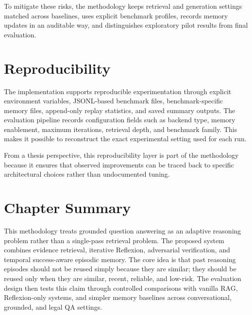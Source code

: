 To mitigate these risks, the methodology keeps retrieval and generation settings matched across baselines, uses explicit benchmark profiles, records memory updates in an auditable way, and distinguishes exploratory pilot results from final evaluation.

\section{Reproducibility}
\label{sec:methodology-reproducibility}

The implementation supports reproducible experimentation through explicit environment variables, JSONL-based benchmark files, benchmark-specific memory files, append-only replay statistics, and saved summary outputs. The evaluation pipeline records configuration fields such as backend type, memory enablement, maximum iterations, retrieval depth, and benchmark family. This makes it possible to reconstruct the exact experimental setting used for each run.

From a thesis perspective, this reproducibility layer is part of the methodology because it ensures that observed improvements can be traced back to specific architectural choices rather than undocumented tuning.

\section{Chapter Summary}
\label{sec:methodology-summary}

This methodology treats grounded question answering as an adaptive reasoning problem rather than a single-pass retrieval problem. The proposed system combines evidence retrieval, iterative Reflexion, adversarial verification, and temporal success-aware episodic memory. The core idea is that past reasoning episodes should not be reused simply because they are similar; they should be reused only when they are similar, recent, reliable, and low-risk. The evaluation design then tests this claim through controlled comparisons with vanilla RAG, Reflexion-only systems, and simpler memory baselines across conversational, grounded, and legal QA settings.
